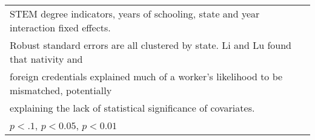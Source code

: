 \begin{table}[htbp]
\begin{tabular}{l*{5}{c}}
\multicolumn{6}{l}{\footnotesize STEM degree indicators, years of schooling, state and year interaction fixed effects.}\\
\multicolumn{6}{l}{\footnotesize Robust standard errors are all clustered by state. Li and Lu found that nativity and}\\
\multicolumn{6}{l}{\footnotesize foreign credentials explained much of a worker's likelihood to be mismatched, potentially}\\
\multicolumn{6}{l}{\footnotesize explaining the lack of statistical significance of covariates.}\\
\multicolumn{6}{l}{\footnotesize \sym{*} \(p<.1\), \sym{**} \(p<0.05\), \sym{***} \(p<0.01\)}\\
\end{tabular}
\end{table}

